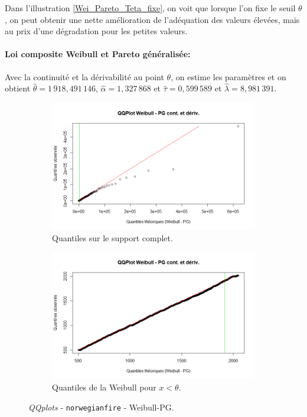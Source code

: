 		Dans l'illustration \ref{Wei_Pareto_Teta_fixe}, on voit que lorsque l'on fixe le seuil $\theta$, on peut obtenir une nette amélioration de l'adéquation des valeurs élevées, mais au prix d'une dégradation pour les petites valeurs.
		
		\paragraph{Loi composite Weibull et Pareto généralisée:} Avec la continuité et la dérivabilité au point $\theta$, on estime les paramètres et on obtient $\hat{\theta} = 1\,918,491\,146 $, $\hat{\alpha} = 1,327\,868 $ et $\hat{\tau}=0,599\,589 $ et $\hat{\lambda}=8,981\,391$.
		\begin{figure}[H]
			\begin{center}
				\begin{subfigure}[b]{0.45\textwidth}
					\includegraphics[scale=0.40]{Graphiques/QQ_Wei_PG_contderiv} 
					\caption{Quantiles sur le support complet.} \label{QQplot_W_PG_conde}
				\end{subfigure}
				\begin{subfigure}[b]{0.4\textwidth}
					\includegraphics[scale=0.40]{Graphiques/QQ_Wei_PG_contderiv_t1} 
					\caption{Quantiles de la Weibull pour $x<\theta$.} \label{QQplot_W_PG_conde_2}
				\end{subfigure}
				\renewcommand{\figurename}{Illustration}
				\caption{\textit{QQplots} - \texttt{norwegianfire} - Weibull-PG.}
			\end{center}
		\end{figure}
		
